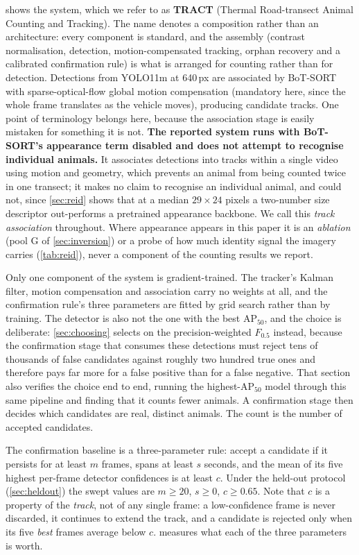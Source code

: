  shows the system, which we refer to as \textbf{TRACT} (Thermal
Road-transect Animal Counting and Tracking). The name denotes a composition rather than an
architecture: every component is standard, and the assembly (contrast normalisation, detection, motion-compensated tracking, orphan recovery and a calibrated confirmation rule) is what is arranged for counting rather than for detection. Detections from YOLO11m at
640\,px are associated by
BoT-SORT~\cite{aharon2022botsort} with sparse-optical-flow global motion compensation (mandatory here, since the whole frame translates as the vehicle moves), producing candidate tracks. One point of terminology belongs here, because the association stage is easily
mistaken for something it is not. \textbf{The reported system runs with BoT-SORT's appearance term disabled and does not attempt to recognise individual animals.} It associates detections into tracks within
a single video using motion and geometry, which prevents an animal from being counted twice in
one transect; it makes no claim to recognise an individual animal, and could not, since
\cref{sec:reid} shows that at a median $29\times24$ pixels a two-number size descriptor
out-performs a pretrained appearance backbone. We call this \emph{track association} throughout. Where appearance appears in this paper it is an
\emph{ablation} (pool G of \cref{sec:inversion}) or a probe of how much identity signal the
imagery carries (\cref{tab:reid}), never a component of the counting results we report.

Only one component of the system is gradient-trained. The tracker's Kalman filter,
motion compensation and association carry no weights at all, and the confirmation rule's three
parameters are fitted by grid search rather than by training. The detector is also not the one
with the best AP$_{50}$, and the choice is deliberate:
\cref{sec:choosing} selects on the precision-weighted $F_{0.5}$ instead, because the
confirmation stage that consumes these detections must reject tens of thousands of false
candidates against roughly two hundred true ones and therefore pays far more for a false
positive than for a false negative. That section also verifies the choice end to end, running
the highest-AP$_{50}$ model through this same pipeline and finding that it counts fewer
animals. A confirmation stage then decides which candidates are real, distinct animals. The
count is the number of accepted candidates.

The confirmation baseline is a three-parameter rule: accept a candidate if it persists for
at least $m$ frames, spans at least $s$ seconds, and the mean of its five highest per-frame
detector confidences is at least $c$. Under the held-out protocol (\cref{sec:heldout}) the
swept values are $m\ge20$, $s\ge0$, $c\ge0.65$. Note that $c$ is a property of the
\emph{track}, not of any single frame: a low-confidence frame is never discarded, it
continues to extend the track, and a candidate is rejected only when its five \emph{best}
frames average below $c$.  measures what each of the three
parameters is worth.

